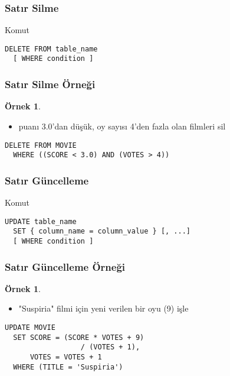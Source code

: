 \documentclass[dvipsnames]{beamer}
\theoremstyle{definition}
\theoremstyle{example}
\newtheorem{ornek}[theorem]{Örnek}
\theoremstyle{plain}
\begin{document}
\begin{frame}[fragile]
  \frametitle{Satır Silme}

  \begin{block}{Komut}
    \begin{lstlisting}
DELETE FROM table_name
  [ WHERE condition ]
    \end{lstlisting}
  \end{block}
\end{frame}

\begin{frame}[fragile]
  \frametitle{Satır Silme Örneği}

  \begin{ornek}
    \begin{itemize}
      \item puanı 3.0'dan düşük, oy sayısı 4'den fazla olan filmleri sil
    \end{itemize}

    \begin{lstlisting}
DELETE FROM MOVIE
  WHERE ((SCORE < 3.0) AND (VOTES > 4))
    \end{lstlisting}
  \end{ornek}
\end{frame}

\begin{frame}[fragile]
  \frametitle{Satır Güncelleme}

  \begin{block}{Komut}
    \begin{lstlisting}
UPDATE table_name
  SET { column_name = column_value } [, ...]
  [ WHERE condition ]
    \end{lstlisting}
  \end{block}
\end{frame}

\begin{frame}[fragile]
  \frametitle{Satır Güncelleme Örneği}

  \begin{ornek}
    \begin{itemize}
      \item "Suspiria" filmi için yeni verilen bir oyu (9) işle
    \end{itemize}

    \begin{lstlisting}
UPDATE MOVIE
  SET SCORE = (SCORE * VOTES + 9)
                  / (VOTES + 1),
      VOTES = VOTES + 1
  WHERE (TITLE = 'Suspiria')
    \end{lstlisting}
  \end{ornek}
\end{frame}
\end{document}
